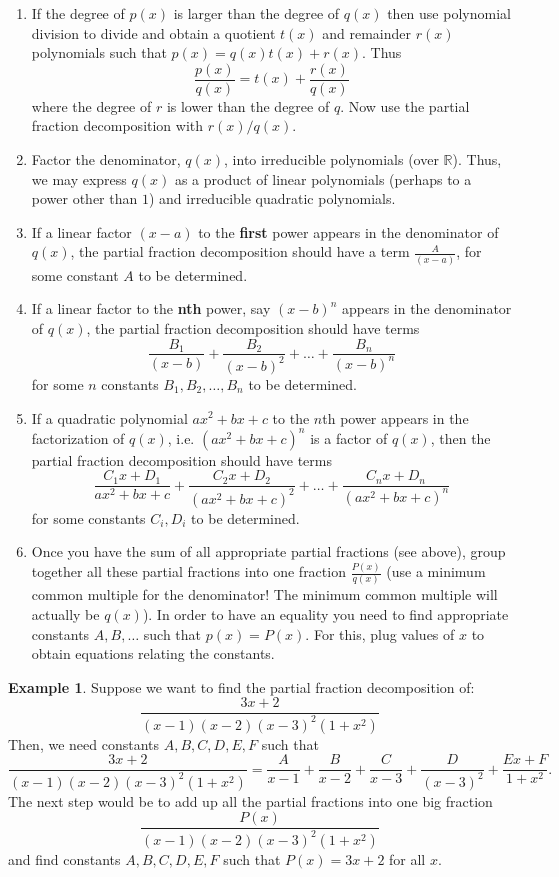\documentclass[12pt]{article}
\theoremstyle{definition}
\newtheorem{exa}[thm]{Example}
\newcommand{\R}{\ensuremath{\mathbb{R}}}
\begin{document}
\begin{enumerate}
\item If the degree of $p(x)$ is larger than the degree of $q(x)$
then use polynomial division to divide and obtain a quotient
$t(x)$ and remainder $r(x)$ polynomials such that
$p(x)=q(x)t(x)+r(x)$. Thus
$$\frac{p(x)}{q(x)}= t(x) + \frac{r(x)}{q(x)}$$
where the degree of $r$ is lower than the degree of $q$. Now use
the partial fraction decomposition with $r(x)/q(x)$.

\item Factor the denominator, $q(x)$, into irreducible polynomials
(over $\R$). Thus, we may express $q(x)$ as a product of linear
polynomials (perhaps to a power other than $1$) and irreducible
quadratic polynomials.

\item If a linear factor $(x-a)$ to the {\bf first} power appears
in the denominator of $q(x)$, the partial fraction decomposition
should have a term $\frac{A}{(x-a)}$, for some constant $A$ to be
determined.

\item If a linear factor to the {\bf nth} power, say $(x-b)^n$
appears in the denominator of $q(x)$, the partial fraction
decomposition should have terms
$$\frac{B_1}{(x-b)}+\frac{B_2}{(x-b)^2}+\ldots+\frac{B_n}{(x-b)^n}$$ for some
$n$ constants $B_1, B_2, \ldots, B_n$ to be determined.

\item If a quadratic polynomial $ax^2+bx+c$ to the $n$th power appears in the
factorization of $q(x)$, i.e. $(ax^2+bx+c)^n$ is a factor of $q(x)$, then the partial fraction decomposition
should have terms
$$\frac{C_1x+D_1}{ax^2+bx+c}+\frac{C_2x+D_2}{(ax^2+bx+c)^2}+\ldots+\frac{C_nx+D_n}{(ax^2+bx+c)^n}$$
for some constants $C_i,D_i$ to be determined.

\item Once you have the sum of all appropriate partial fractions
(see above), group together all these partial fractions into one
fraction $\frac{P(x)}{q(x)}$ (use a minimum common multiple for
the denominator! The minimum common multiple will actually be
$q(x)$). In order to have an equality you need to find appropriate
constants $A,B,\ldots$ such that $p(x)=P(x)$. For this, plug
values of $x$ to obtain equations relating the constants.
\end{enumerate}

\begin{exa}
Suppose we want to find the partial fraction decomposition of:
$$\frac{3x+2}{(x-1)(x-2)(x-3)^2(1+x^2)}$$
Then, we need constants $A,B,C,D,E,F$ such that
$$\frac{3x+2}{(x-1)(x-2)(x-3)^2(1+x^2)}=\frac{A}{x-1} + \frac{B}{x-2}+\frac{C}{x-3}+\frac{D}{(x-3)^2}+\frac{Ex+F}{1+x^2}.$$
The next step would be to add up all the partial fractions into
one big fraction $$\frac{P(x)}{(x-1)(x-2)(x-3)^2(1+x^2)}$$ and
find constants $A,B,C,D,E,F$ such that $P(x)=3x+2$ for all $x$.
\end{exa}
\end{document}
